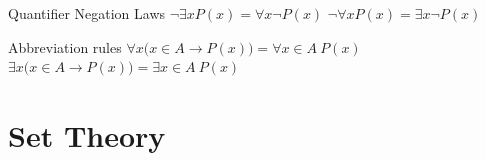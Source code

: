 \documentclass[12pt]{article}
\begin{document}
\begin{flushleft}
	Quantifier Negation Laws \linebreak
	\textbullet \quad $ \lnot \exists x P(x) = \forall x \lnot P(x) $ \linebreak
	\textbullet \quad $ \lnot \forall x P(x) = \exists x \lnot P(x) $ \linebreak
	
	Abbreviation rules \linebreak
	\textbullet \quad $ \forall x \big( x \in A \rightarrow P(x) \big) = \forall x \in A\ P(x) $ \linebreak
	\textbullet \quad $ \exists x \big( x \in A \rightarrow P(x) \big) = \exists x \in A\ P(x) $ \linebreak

	
	\pagebreak
	
	
	\section{Set Theory}	


\end{flushleft}
\end{document}
